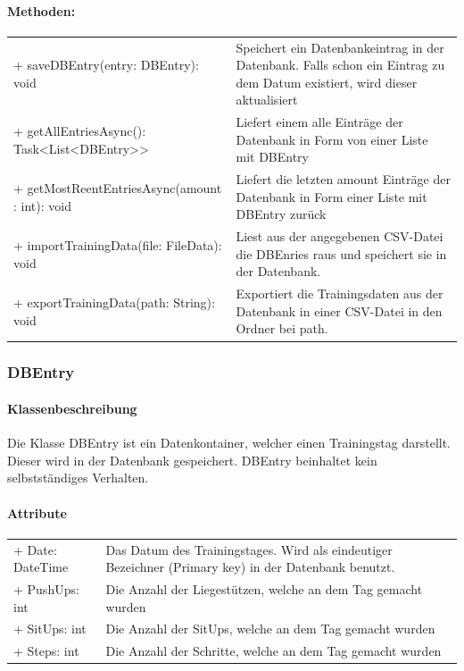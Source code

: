 \documentclass[a4paper,12pt]{article}
\begin{document}
	\paragraph{Methoden:}
	\begin{tabular}{p{7cm}p{10cm}}
		+ saveDBEntry(entry: DBEntry): void & Speichert ein Datenbankeintrag in der \gls{Datenbank}. Falls schon ein Eintrag zu dem Datum existiert, wird dieser aktualisiert\\
		+ getAllEntriesAsync(): Task<List<DBEntry>> &Liefert einem alle Einträge der Datenbank in Form von einer Liste mit DBEntry \\ 
		+ getMostReentEntriesAsync(amount : int): void &Liefert  die letzten amount Einträge der Datenbank in Form einer Liste mit DBEntry zurück\\
		+ importTrainingData(file: FileData): void & Liest aus der angegebenen \gls{CSV}-Datei die DBEnries raus und speichert sie in der \gls{Datenbank}.\\
		+ exportTrainingData(path: String): void& Exportiert die Trainingsdaten aus der \gls{Datenbank} in einer \gls{CSV}-Datei in den Ordner bei path. \\
	\end{tabular}

\subsubsection{DBEntry}
	\paragraph{Klassenbeschreibung}
	Die Klasse DBEntry ist ein Datenkontainer, welcher einen Trainingstag darstellt. Dieser wird in der Datenbank gespeichert. DBEntry beinhaltet kein selbstständiges Verhalten.
	
	\paragraph{Attribute}
	\begin{tabular}{p{7cm}p{10cm}}
	+ Date: DateTime & Das Datum des Trainingstages. Wird als eindeutiger Bezeichner (Primary key) in der Datenbank benutzt.\\
	+ PushUps: int & Die Anzahl der Liegestützen, welche an dem Tag gemacht wurden \\
	+ SitUps: int & Die Anzahl der SitUps, welche an dem Tag gemacht wurden \\
	+ Steps: int & Die Anzahl der Schritte, welche an dem Tag gemacht wurden \\
	\end{tabular}
	 
\end{document}
